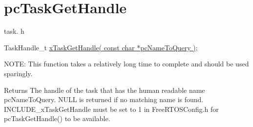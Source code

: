 \hypertarget{group__pcTaskGetHandle}{}\section{pc\+Task\+Get\+Handle}
\label{group__pcTaskGetHandle}
task. h 
\begin{DoxyPre}TaskHandle\_t \hyperlink{task_8h_a45b3b1cd0227269609499beeeb8c5c26}{xTaskGetHandle( const char *pcNameToQuery )};\end{DoxyPre}


N\+O\+TE\+: This function takes a relatively long time to complete and should be used sparingly.

\begin{DoxyReturn}{Returns}
The handle of the task that has the human readable name pc\+Name\+To\+Query. N\+U\+LL is returned if no matching name is found. I\+N\+C\+L\+U\+D\+E\+\_\+x\+Task\+Get\+Handle must be set to 1 in Free\+R\+T\+O\+S\+Config.\+h for pc\+Task\+Get\+Handle() to be available. 
\end{DoxyReturn}

